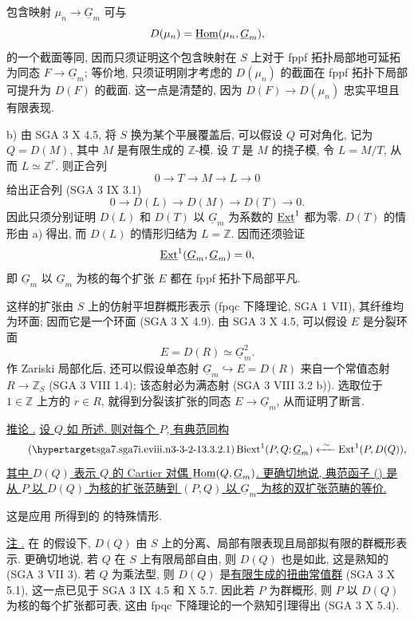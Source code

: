 包含映射 $\mu_n\longrightarrow\underline G_m$ 可与
\[
 D(\mu_n)=\uHom(\mu_n,\underline G_m),
\]
的一个截面等同, 因而只须证明这个包含映射在 $S$ 上对于 fppf 拓扑局部地可延拓为同态 $F\longrightarrow\underline G_m$; 等价地, 只须证明刚才考虑的 $D(\mu_n)$ 的截面在 fppf 拓扑下局部可提升为 $D(F)$ 的截面. 这一点是清楚的, 因为 $D(F)\longrightarrow D(\mu_n)$ 忠实平坦且有限表现.

\medskip
\noindent b) 由 SGA 3 X 4.5, 将 $S$ 换为某个平展覆盖后, 可以假设 $Q$ 可对角化, 记为 $Q=D(M)$, 其中 $M$ 是有限生成的 $\mathbb Z$-模. 设 $T$ 是 $M$ 的挠子模, 令 $L=M/T$, 从而 $L\simeq\mathbb Z^r$. 则正合列
\[
 0\longrightarrow T\longrightarrow M\longrightarrow L
 \longrightarrow0
\]
给出正合列 (SGA 3 IX 3.1)
\[
 0\longrightarrow D(L)\longrightarrow D(M)\longrightarrow D(T)
 \longrightarrow0.
\]
因此只须分别证明 $D(L)$ 和 $D(T)$ 以 $\underline G_m$ 为系数的 $\uExt^1$ 都为零. $D(T)$ 的情形由 a) 得出, 而 $D(L)$ 的情形归结为 $L=\mathbb Z$. 因而还须验证
\[
 \uExt^1(\underline G_m,\underline G_m)=0,
\]
即 $\underline G_m$ 以 $\underline G_m$ 为核的每个扩张 $E$ 都在 fppf 拓扑下局部平凡.

这样的扩张由 $S$ 上的仿射平坦群概形表示 (fpqc 下降理论, SGA 1 VII), 其纤维均为环面; 因而它是一个环面 (SGA 3 X 4.9). 由 SGA 3 X 4.5, 可以假设 $E$ 是分裂环面
\[
 E=D(R)\simeq\underline G_m^2.
\]
作 Zariski 局部化后, 还可以假设单态射 $\underline G_m\hookrightarrow E=D(R)$ 来自一个常值态射 $R\longrightarrow\mathbb Z_S$ (SGA 3 VIII 1.4); 该态射必为满态射 (SGA 3 VIII 3.2 b)). 选取位于 $1\in\mathbb Z$ 上方的 $r\in R$, 就得到分裂该扩张的同态 $E\longrightarrow\underline G_m$, 从而证明了断言.

\medskip
\noindent\underline{推论 .} \underline{设 $Q$ 如  所述. 则对每个 $P$, 有典范同构}
\begin{equation}\tag{\SGARefTarget{sga7.sga7i.eviii.n3-3-2-1}{3.3.2.1}}
 \Biext^1(P,Q;\underline G_m)
 \xleftarrow{\ \sim\ }\Ext^1(P,D(Q)),
\end{equation}
\underline{其中 $D(Q)$ 表示 $Q$ 的 Cartier 对偶 $\uHom(Q,\underline G_m)$. 更确切地说, 典范函子 () 是从 $P$ 以 $D(Q)$ 为核的扩张范畴到 $(P,Q)$ 以 $\underline G_m$ 为核的双扩张范畴的等价.}

这是应用  所得到的  的特殊情形.

\medskip
\noindent\underline{注 .} 在  的假设下, $D(Q)$ 由 $S$ 上的分离、局部有限表现且局部拟有限的群概形表示. 更确切地说, 若 $Q$ 在 $S$ 上有限局部自由, 则 $D(Q)$ 也是如此, 这是熟知的 (SGA 3 VII 3). 若 $Q$ 为乘法型, 则 $D(Q)$ 是\underline{有限生成的扭曲常值群} (SGA 3 X 5.1), 这一点已见于 SGA 3 IX 4.5 和 X 5.7. 因此若 $P$ 为群概形, 则 $P$ 以 $D(Q)$ 为核的每个扩张都可表, 这由 fpqc 下降理论的一个熟知引理得出 (SGA 3 X 5.4).


